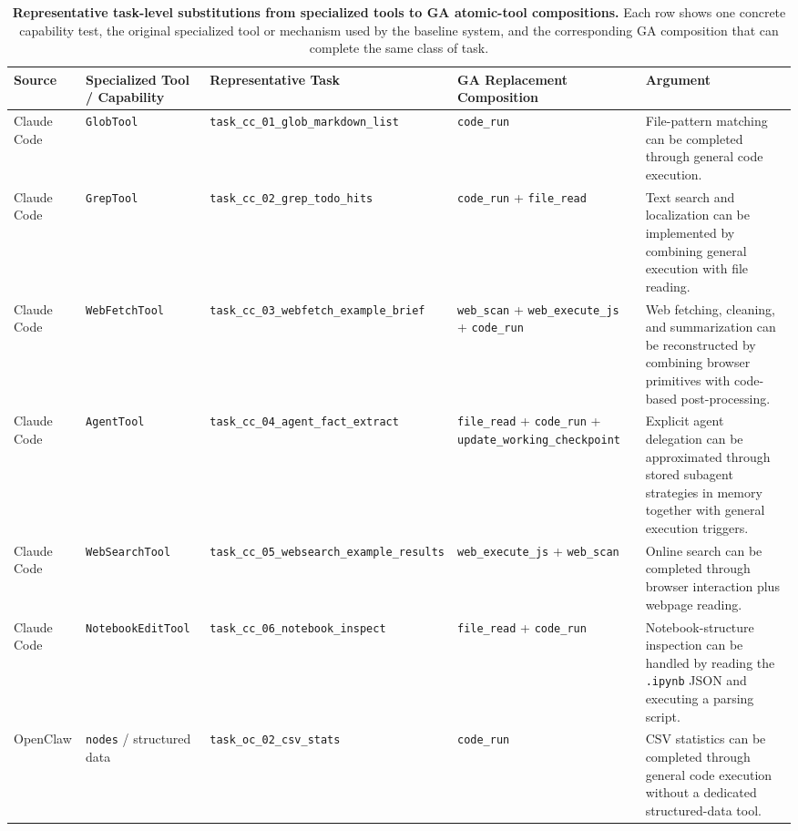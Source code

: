 \begin{table}[t]
\centering
\small
\def\arraystretch{1.02}
\setlength{\tabcolsep}{0.35em}
\begin{tabularx}{\textwidth}{@{}>{\raggedright\arraybackslash}p{}>{\raggedright\arraybackslash}p{}>{\raggedright\arraybackslash}X>{\raggedright\arraybackslash}X>{\raggedright\arraybackslash}X@{}}
\toprule
\textbf{Source} & \textbf{Specialized Tool / Capability} & \textbf{Representative Task} & \textbf{GA Replacement Composition} & \textbf{Argument} \\
\midrule
Claude Code & \texttt{GlobTool} & \texttt{task\_cc\_01\_glob\_markdown\_list} & \texttt{code\_run} & File-pattern matching can be completed through general code execution. \\
Claude Code & \texttt{GrepTool} & \texttt{task\_cc\_02\_grep\_todo\_hits} & \texttt{code\_run} + \texttt{file\_read} & Text search and localization can be implemented by combining general execution with file reading. \\
\cmidrule(lr){1-5}
Claude Code & \texttt{WebFetchTool} & \texttt{task\_cc\_03\_webfetch\_example\_brief} & \texttt{web\_scan} + \texttt{web\_execute\_js} + \texttt{code\_run} & Web fetching, cleaning, and summarization can be reconstructed by combining browser primitives with code-based post-processing. \\
Claude Code & \texttt{AgentTool} & \texttt{task\_cc\_04\_agent\_fact\_extract} & \texttt{file\_read} + \texttt{code\_run} + \texttt{update\_working\_checkpoint} & Explicit agent delegation can be approximated through stored subagent strategies in memory together with general execution triggers. \\
\cmidrule(lr){1-5}
Claude Code & \texttt{WebSearchTool} & \texttt{task\_cc\_05\_websearch\_example\_results} & \texttt{web\_execute\_js} + \texttt{web\_scan} & Online search can be completed through browser interaction plus webpage reading. \\
Claude Code & \texttt{NotebookEditTool} & \texttt{task\_cc\_06\_notebook\_inspect} & \texttt{file\_read} + \texttt{code\_run} & Notebook-structure inspection can be handled by reading the \texttt{.ipynb} JSON and executing a parsing script. \\
\cmidrule(lr){1-5}
OpenClaw & \texttt{nodes} / structured data & \texttt{task\_oc\_02\_csv\_stats} & \texttt{code\_run} & CSV statistics can be completed through general code execution without a dedicated structured-data tool. \\
\bottomrule
\end{tabularx}
\caption{\textbf{Representative task-level substitutions from specialized tools to GA atomic-tool compositions.} Each row shows one concrete capability test, the original specialized tool or mechanism used by the baseline system, and the corresponding GA composition that can complete the same class of task.}
\label{tab:appendix_tool_replacement_examples}
\end{table}


